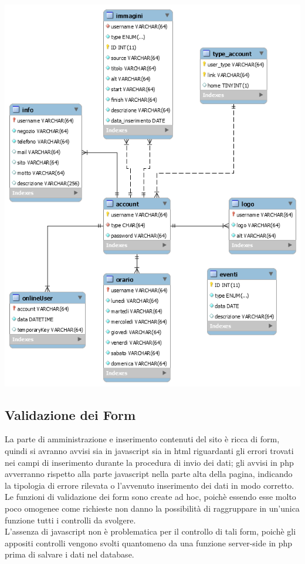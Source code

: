 \documentclass[a4paper,12pt]{article}
\begin{document}
\vskip1cm
\begin{center}
	\includegraphics[width=0.8\linewidth]{images/diagram}\\
\end{center}
\vskip1cm
\newpage

\subsection{Validazione dei Form}
La parte di amministrazione e inserimento contenuti del sito è ricca di form, quindi si avranno avvisi sia in javascript sia in html riguardanti gli errori trovati nei campi di inserimento durante la procedura di invio dei dati; gli avvisi in php avverranno rispetto alla parte javascript nella parte alta della pagina, indicando la tipologia di errore rilevata o l'avvenuto inserimento dei dati in modo corretto.\\
Le funzioni di validazione dei form sono create ad hoc, poichè essendo esse molto poco omogenee come richieste non danno la possibilità di raggruppare in un'unica funzione tutti i controlli da svolgere.\\
L'assenza di javascript non è problematica per il controllo di tali form, poichè gli appositi controlli vengono svolti quantomeno da una funzione server-side in php prima di salvare i dati nel database.\\
\end{document}
